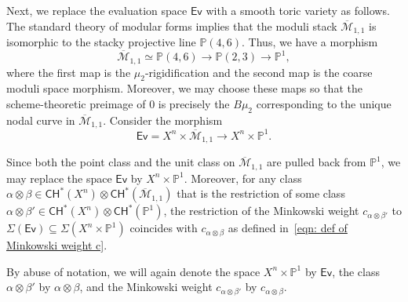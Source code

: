\documentclass{article}
\def\Ev{{\mathsf{Ev}}}
\def\oM{\overline{\mathcal{M}}}
\def\P{\mathbb{P}}
\begin{document}
Next, we replace the evaluation space $\Ev$ with a smooth toric variety as follows. 
The standard theory of modular forms implies that the moduli stack $\oM_{1,1}$ is isomorphic to the stacky projective line 
$\P(4,6)$. Thus, we have a morphism
\[
\oM_{1,1} \simeq \P(4,6) \to \P(2,3) \to \P^1,
\]
where the first map is the $\mu_2$-rigidification and the second map is the coarse moduli space morphism. Moreover, we may choose these maps so that the scheme-theoretic preimage of $0$ is precisely the $B\mu_2$ corresponding to the unique nodal curve  in $\oM_{1,1}$. Consider the morphism
\[
\Ev = X^n \times \oM_{1,1} \longrightarrow X^n \times \P^1 .
\]

Since both the point class and the unit class on $\oM_{1,1}$ are pulled back from $\P^1$, we may replace the space $\Ev$ by $X^n \times \P^1$. Moreover, for any class  $\alpha \otimes \beta \in \mathsf{CH}^*(X^n) \otimes \mathsf{CH}^*(\oM_{1,1})$ that is the restriction of some class $\alpha \otimes \beta' \in \mathsf{CH}^*(X^n) \otimes \mathsf{CH}^*(\P^1)$, the restriction of the Minkowski weight $c_{\alpha \otimes \beta'}$ to $\Sigma(\Ev) \subseteq \Sigma(X^n \times \P^1)$ coincides with $c_{\alpha \otimes \beta}$  as defined in~\eqref{eqn: def of Minkowski weight c}. 

By abuse of notation, we will again denote the space $X^n \times \P^1$ by $\Ev$, the class 
$\alpha \otimes \beta'$ by $\alpha \otimes \beta$, and the Minkowski weight 
$c_{\alpha \otimes \beta'}$ by $c_{\alpha \otimes \beta}$.
\end{document}

